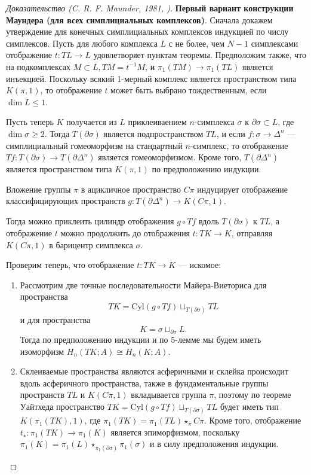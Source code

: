 \documentclass[14pt, dvipsnames, twoside]{extarticle}
\theoremstyle{definition}
\theoremstyle{remark}
\begin{document}
\begin{proof}[Доказательство {\normalfont (C. R. F. Maunder, 1981, \cite{Maunder})}] 

{\bf Первый вариант конструкции Маундера (для всех симплициальных комплексов)}. Сначала докажем утверждение для конечных симплициальных комплексов индукцией по числу  симплексов. Пусть для любого комплекса $L$ с не более, чем $N-1$ симплексами отображение $t:TL\to L$ удовлетворяет пунктам теоремы. Предположим также, что на подкомплексах $M\subset L, TM=t^{-1}M$, и $\pi_1(TM)\to \pi_1(TL)$ является инъекцией. Поскольку всякий 1-мерный комплекс является пространством типа $K(\pi, 1)$, то отображение $t$ может быть выбрано тождественным, если $\dim L\leqslant 1$.

Пусть теперь $K$ получается из $L$ приклеиваением $n$-симплекса $\sigma$ к $\partial\sigma\subset L$, где $\dim \sigma\geqslant 2$. Тогда $T(\partial\sigma)$ является подпространством $TL$, и если $f:\sigma\to \Delta^n$ --- симплициальный гомеоморфизм на стандартный $n$-симплекс, то отображение $Tf:T(\partial\sigma)\to T(\partial\Delta^n)$ является гомеоморфизмом. Кроме того, $T(\partial\Delta^n)$ является пространством типа $K(\pi, 1)$ по предположению индукции. 

Вложение группы $\pi$ в ацикличное пространство $C\pi$ индуцирует отображение классифицирующих пространств $g: T(\partial \Delta^n)\to K(C\pi, 1)$. 

Тогда можно приклеить цилиндр отображения $g\circ Tf$ вдоль $T(\partial\sigma)$ к $TL$, а отображение $t$ можно продолжить до отображения $t:TK\to K$, отправляя $K(C\pi, 1)$ в барицентр симплекса $\sigma$.

Проверим теперь, что отображение $t:TK\to K$ --- искомое:

\begin{enumerate}[\bf 1.]

\item Рассмотрим две точные последовательности Майера-Виеториса для пространства $$TK=\mathrm{Cyl}(g\circ Tf)\sqcup_{T(\partial\sigma)}TL$$ и для пространства $$K=\sigma\sqcup_{\partial \sigma}L.$$ Тогда по предположению индукции и по 5-лемме мы будем иметь изоморфизм $H_n(TK; A)\cong H_n(K; A)$.

\item  Склеиваемые пространства являются асферичными и склейка происходит вдоль асферичного пространства, также в фундаментальные группы пространств $TL$ и $K(C\pi, 1)$ вкладывается группа $\pi$, поэтому по теореме Уайтхеда пространство $TK=\mathrm{Cyl}(g\circ Tf)\sqcup_{T(\partial\sigma)}TL$ будет иметь тип $K(\pi_1(TK), 1)$, где $\pi_1(TK)=\pi_1(TL)\star_{\pi} C\pi$. Кроме того, отображение $t_\star: \pi_1(TK)\to \pi_1(K)$ является эпиморфизмом, поскольку $\pi_1(K)=\pi_1(L)\star_{\pi_1(\partial\sigma)}\pi_1(\sigma)$ и в силу предположения индукции. 


\end{enumerate}
\end{proof}
\end{document}
